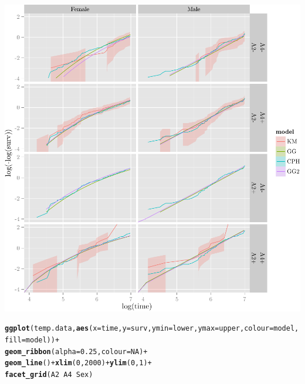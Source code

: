 \documentclass{article}\usepackage[]{graphicx}\usepackage[]{color}
\makeatletter
\def\maxwidth{ %
  \ifdim\Gin@nat@width>\linewidth
    \linewidth
  \else
    \Gin@nat@width
  \fi
}
\newcommand{\hlnum}[1]{\textcolor[rgb]{0.686,0.059,0.569}{#1}}%
\newcommand{\hlopt}[1]{\textcolor[rgb]{0,0,0}{#1}}%
\newcommand{\hlstd}[1]{\textcolor[rgb]{0.345,0.345,0.345}{#1}}%
\newcommand{\hlkwc}[1]{\textcolor[rgb]{0.333,0.667,0.333}{#1}}%
\newcommand{\hlkwd}[1]{\textcolor[rgb]{0.737,0.353,0.396}{\textbf{#1}}}%
\newenvironment{kframe}{%
 \def\at@end@of@kframe{}%
 \ifinner\ifhmode%
  \def\at@end@of@kframe{\end{minipage}}%
  \begin{minipage}{\columnwidth}%
 \fi\fi%
 \def\FrameCommand##1{\hskip\@totalleftmargin \hskip-\fboxsep
 \colorbox{shadecolor}{##1}\hskip-\fboxsep
     \hskip-\linewidth \hskip-\@totalleftmargin \hskip\columnwidth}%
 \MakeFramed {\advance\hsize-\width
   \@totalleftmargin\z@ \linewidth\hsize
   \@setminipage}}%
 {\par\unskip\endMakeFramed%
 \at@end@of@kframe}
\newenvironment{knitrout}{}{} %
\makeatother
\begin{document}
\begin{knitrout}
{\centering \includegraphics[width=\maxwidth]{figure/05-final-fit-assessment-3-1} 

}


\begin{kframe}\begin{alltt}
\hlkwd{ggplot}\hlstd{(temp.data,} \hlkwd{aes}\hlstd{(}\hlkwc{x} \hlstd{= time,} \hlkwc{y} \hlstd{= surv,} \hlkwc{ymin} \hlstd{= lower,} \hlkwc{ymax} \hlstd{= upper,} \hlkwc{colour} \hlstd{= model,} \hlkwc{fill} \hlstd{= model))} \hlopt{+}
        \hlkwd{geom_ribbon}\hlstd{(}\hlkwc{alpha} \hlstd{=} \hlnum{0.25}\hlstd{,} \hlkwc{colour} \hlstd{=} \hlnum{NA}\hlstd{)} \hlopt{+}
        \hlkwd{geom_line}\hlstd{()} \hlopt{+} \hlkwd{xlim}\hlstd{(}\hlnum{0}\hlstd{,} \hlnum{2000}\hlstd{)} \hlopt{+} \hlkwd{ylim}\hlstd{(}\hlnum{0}\hlstd{,} \hlnum{1}\hlstd{)} \hlopt{+}
        \hlkwd{facet_grid}\hlstd{(A2} \hlopt{~} \hlstd{A4} \hlopt{~} \hlstd{Sex)}
\end{alltt}


{\ttfamily\noindent\color{warningcolor}{\#\# Warning: Removed 4 rows containing missing values (geom\_path).}}

{\ttfamily\noindent\color{warningcolor}{\#\# Warning: Removed 2 rows containing missing values (geom\_path).}}

{\ttfamily\noindent\color{warningcolor}{\#\# Warning: Removed 5 rows containing missing values (geom\_path).}}


\end{kframe}
\end{knitrout}
\end{document}
